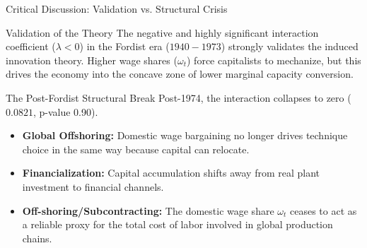 \documentclass[10pt]{beamer}
\begin{document}
\begin{frame}{Critical Discussion: Validation vs. Structural Crisis}
  \begin{block}{Validation of the Theory}
    The negative and highly significant interaction coefficient ($\lambda < 0$) in the Fordist era ($1940-1973$) strongly validates the induced innovation theory. Higher wage shares ($\omega_t$) force capitalists to mechanize, but this drives the economy into the concave zone of lower marginal capacity conversion.
  \end{block}
  \begin{block}{The Post-Fordist Structural Break}
    Post-1974, the interaction collapses to zero ($0.0821$, p-value 0.90).
    \begin{itemize}
      \item \textbf{Global Offshoring:} Domestic wage bargaining no longer drives technique choice in the same way because capital can relocate.
      \item \textbf{Financialization:} Capital accumulation shifts away from real plant investment to financial channels.
      \item \textbf{Off-shoring/Subcontracting:} The domestic wage share $\omega_t$ ceases to act as a reliable proxy for the total cost of labor involved in global production chains.
    \end{itemize}
  \end{block}
\end{frame}
\end{document}
